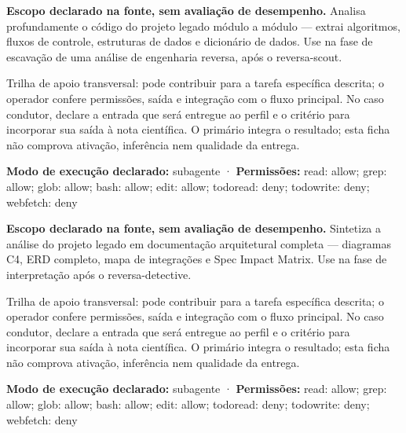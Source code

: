 \begin{descricao}
\textbf{Escopo declarado na fonte, sem avaliação de desempenho.}
Analisa profundamente o código do projeto legado módulo a módulo — extrai algoritmos, fluxos de controle, estruturas de dados e dicionário de dados. Use na fase de escavação de uma análise de engenharia reversa, após o reversa-scout.
\end{descricao}

\begin{funcao}
Trilha de apoio transversal: pode contribuir para a tarefa específica descrita; o operador confere permissões, saída e integração com o fluxo principal. No caso condutor, declare a entrada que será entregue ao perfil e o critério para incorporar sua saída à nota científica. O primário integra o resultado; esta ficha não comprova ativação, inferência nem qualidade da entrega.
\end{funcao}

\begin{arquitetura}
\textbf{Modo de execução declarado:} subagente · \textbf{Permissões:} read: allow; grep: allow; glob: allow; bash: allow; edit: allow; todoread: deny; todowrite: deny; webfetch: deny
\end{arquitetura}


\begin{descricao}
\textbf{Escopo declarado na fonte, sem avaliação de desempenho.}
Sintetiza a análise do projeto legado em documentação arquitetural completa — diagramas C4, ERD completo, mapa de integrações e Spec Impact Matrix. Use na fase de interpretação após o reversa-detective.
\end{descricao}

\begin{funcao}
Trilha de apoio transversal: pode contribuir para a tarefa específica descrita; o operador confere permissões, saída e integração com o fluxo principal. No caso condutor, declare a entrada que será entregue ao perfil e o critério para incorporar sua saída à nota científica. O primário integra o resultado; esta ficha não comprova ativação, inferência nem qualidade da entrega.
\end{funcao}

\begin{arquitetura}
\textbf{Modo de execução declarado:} subagente · \textbf{Permissões:} read: allow; grep: allow; glob: allow; bash: allow; edit: allow; todoread: deny; todowrite: deny; webfetch: deny
\end{arquitetura}


